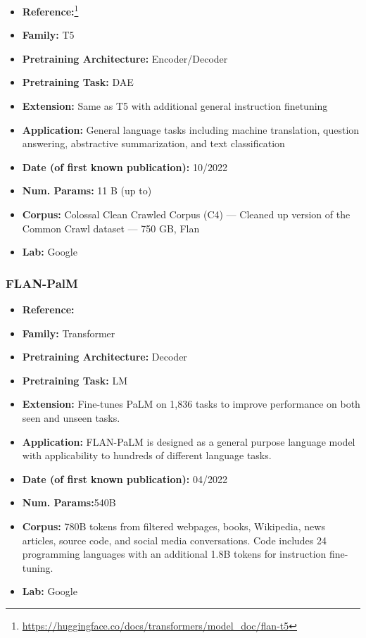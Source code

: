 \documentclass{article}
\begin{document}
            \begin{itemize}
                \item \textbf{Reference:}\footnote{\url{https://huggingface.co/docs/transformers/model_doc/flan-t5}}\cite{chung2022flan}
                \item \textbf{Family:} T5
                \item \textbf{Pretraining Architecture:} Encoder/Decoder
                \item \textbf{Pretraining Task:} DAE
                \item \textbf{Extension:} Same as T5 with additional general instruction finetuning
                \item \textbf{Application:} General language tasks including machine translation, question answering, abstractive summarization, and text classification
                \item \textbf{Date (of first known publication):} 10/2022
                \item \textbf{Num. Params:} 11 B (up to)
                \item \textbf{Corpus:} Colossal Clean Crawled Corpus (C4) — Cleaned up version of the Common Crawl dataset — 750 GB, Flan
                \item \textbf{Lab:} Google
            \end{itemize}

\subsubsection{FLAN-PalM}

            \begin{itemize}
                \item \textbf{Reference:}\cite{chung2022flan}
                \item \textbf{Family:} Transformer 
                \item \textbf{Pretraining Architecture:} Decoder
                \item \textbf{Pretraining Task:} LM
                \item \textbf{Extension:} Fine-tunes PaLM on 1,836 tasks to improve performance on both seen and unseen tasks.
                \item \textbf{Application:} FLAN-PaLM is designed as a general purpose language model with applicability to hundreds of different language tasks.
                \item \textbf{Date (of first known publication):} 04/2022
                \item \textbf{Num. Params:}540B
                \item \textbf{Corpus:} 780B tokens from filtered webpages, books, Wikipedia, news articles, source code, and social media conversations. Code includes 24 programming languages with an additional 1.8B tokens for instruction fine-tuning.
                \item \textbf{Lab:} Google
            \end{itemize}
\end{document}
